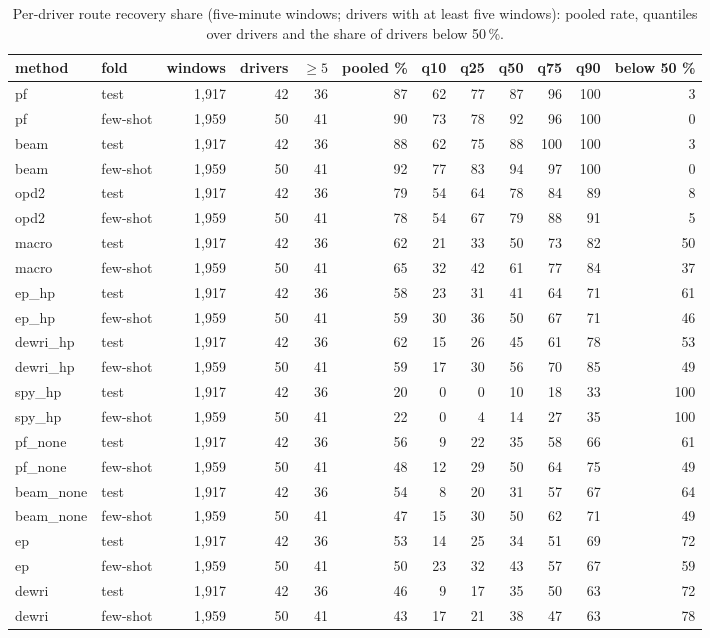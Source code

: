 \begin{table}[t]\centering\scriptsize\setlength{\tabcolsep}{3pt}
\caption{Per-driver route recovery share (five-minute windows; drivers with at least five windows): pooled rate, quantiles over drivers and the share of drivers below 50\,\%.}\label{tab:supp_driver}
\begin{tabular}{llrrrrrrrrrr}\toprule
method & fold & windows & drivers & $\ge 5$ & pooled \% & q10 & q25 & q50 & q75 & q90 & below 50 \% \\\midrule
pf & test & 1{,}917 & 42 & 36 & 87 & 62 & 77 & 87 & 96 & 100 & 3 \\
pf & few-shot & 1{,}959 & 50 & 41 & 90 & 73 & 78 & 92 & 96 & 100 & 0 \\
beam & test & 1{,}917 & 42 & 36 & 88 & 62 & 75 & 88 & 100 & 100 & 3 \\
beam & few-shot & 1{,}959 & 50 & 41 & 92 & 77 & 83 & 94 & 97 & 100 & 0 \\
opd2 & test & 1{,}917 & 42 & 36 & 79 & 54 & 64 & 78 & 84 & 89 & 8 \\
opd2 & few-shot & 1{,}959 & 50 & 41 & 78 & 54 & 67 & 79 & 88 & 91 & 5 \\
macro & test & 1{,}917 & 42 & 36 & 62 & 21 & 33 & 50 & 73 & 82 & 50 \\
macro & few-shot & 1{,}959 & 50 & 41 & 65 & 32 & 42 & 61 & 77 & 84 & 37 \\
ep\_hp & test & 1{,}917 & 42 & 36 & 58 & 23 & 31 & 41 & 64 & 71 & 61 \\
ep\_hp & few-shot & 1{,}959 & 50 & 41 & 59 & 30 & 36 & 50 & 67 & 71 & 46 \\
dewri\_hp & test & 1{,}917 & 42 & 36 & 62 & 15 & 26 & 45 & 61 & 78 & 53 \\
dewri\_hp & few-shot & 1{,}959 & 50 & 41 & 59 & 17 & 30 & 56 & 70 & 85 & 49 \\
spy\_hp & test & 1{,}917 & 42 & 36 & 20 & 0 & 0 & 10 & 18 & 33 & 100 \\
spy\_hp & few-shot & 1{,}959 & 50 & 41 & 22 & 0 & 4 & 14 & 27 & 35 & 100 \\
pf\_none & test & 1{,}917 & 42 & 36 & 56 & 9 & 22 & 35 & 58 & 66 & 61 \\
pf\_none & few-shot & 1{,}959 & 50 & 41 & 48 & 12 & 29 & 50 & 64 & 75 & 49 \\
beam\_none & test & 1{,}917 & 42 & 36 & 54 & 8 & 20 & 31 & 57 & 67 & 64 \\
beam\_none & few-shot & 1{,}959 & 50 & 41 & 47 & 15 & 30 & 50 & 62 & 71 & 49 \\
ep & test & 1{,}917 & 42 & 36 & 53 & 14 & 25 & 34 & 51 & 69 & 72 \\
ep & few-shot & 1{,}959 & 50 & 41 & 50 & 23 & 32 & 43 & 57 & 67 & 59 \\
dewri & test & 1{,}917 & 42 & 36 & 46 & 9 & 17 & 35 & 50 & 63 & 72 \\
dewri & few-shot & 1{,}959 & 50 & 41 & 43 & 17 & 21 & 38 & 47 & 63 & 78 \\
\bottomrule\end{tabular}
\end{table}
